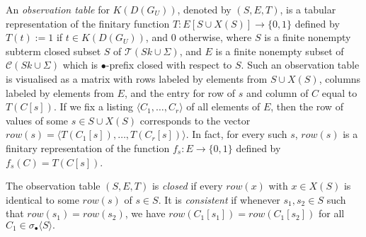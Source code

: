 \documentclass[preprint,12pt,english]{article}
\def\hole{\bullet}
\def\cC{\mathcal{C}}
\def\cT{\mathcal{T}}
\newcommand\pair[1]{\langle{#1}\rangle}
\newcommand\comment[1]{}
\begin{document}
An {\em observation table} for $K(D(G_U))$, denoted by $(S,E,T)$, is a tabular representation of the finitary function $T:E[S\cup X(S)]\to\{0,1\}$
defined by $T(t):=1$ if $t\in K(D(G_U))$, and 0 otherwise,
where $S$ is a finite nonempty subterm closed subset $S$ of $\cT(Sk\cup\Sigma)$, and $E$ is a finite nonempty subset of $\cC(Sk\cup\Sigma)$ which is $\bullet$-prefix closed with respect to $S$.
Such an observation table is visualised as a matrix with rows labeled by elements from $S\cup X(S)$, columns labeled by elements from $E$, and the entry for row of $s$ and column of $C$ equal to $T(C[s])$. If we fix a listing $\pair{C_1,\ldots,C_r}$ of all elements of $E$, then the row of values of some $s\in S\cup X(S)$ corresponds to the vector $row(s)=\pair{T(C_1[s]),\ldots,T(C_r[s])}$. In fact, for every such $s$, $row(s)$ is a finitary representation of the function $f_s:E\to \{0,1\}$ defined by $f_s(C)=T(C[s])$. 


\comment{\begin{figure}[ht]
$$\begin{array}{|c|ccc|} \hline
T&\ldots&C\in E&\ldots \\ \hline
\vdots&&\vdots& \\
s\in S& \ldots&T(C[s])&\ldots \\ 
\vdots& &\vdots&\\ \hline\hline
\vdots& &\vdots&  \\ 
x\in X(S)&\ldots&T(C[x]) &\ldots\\
\vdots& &\vdots&  \\ \hline
\end{array}$$
\caption{Tabular representation of an observation table $(S,E,T)$.}
\label{opa}
\end{figure}}

The observation table $(S,E,T)$ is {\em closed} if every  $row(x)$ with $x\in X(S)$ is identical to some $row(s)$ of $s\in S$. It is 
{\em consistent} if whenever $s_1,s_2\in S$ such that $row(s_1)=row(s_2)$, we have $row(C_1[s_1])=row(C_1[s_2])$
for all $C_1\in\sigma_\hole\pair{S}.$
\end{document}
